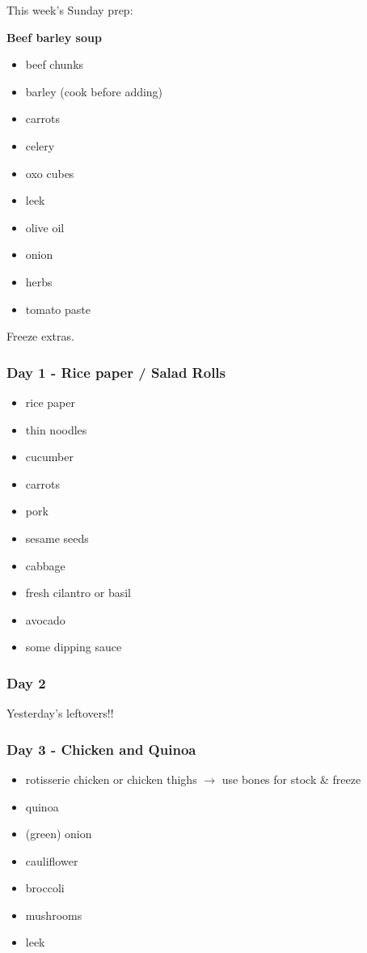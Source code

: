\documentclass[11pt, a4paper]{article}
\begin{document}
This week's Sunday prep:
\par
\vspace{1pc}
\noindent\textbf{Beef barley soup}
\par
\begin{itemize}
\item beef chunks
\item barley (cook before adding)
\item carrots
\item celery
\item oxo cubes
\item leek
\item olive oil
\item onion
\item herbs
\item tomato paste
\end{itemize}
Freeze extras.

\subsubsection{Day 1 - Rice paper / Salad Rolls}
\vspace{1pc}
\begin{itemize}
\item rice paper
\item thin noodles 
\item cucumber
\item carrots
\item pork
\item sesame seeds
\item cabbage
\item fresh cilantro or basil
\item avocado
\item some dipping sauce
\end{itemize}

\subsubsection{Day 2}
\vspace{1pc}
Yesterday's leftovers!!

\subsubsection{Day 3 - Chicken and Quinoa}
\vspace{1pc}
\begin{itemize}
\item rotisserie chicken or chicken thighs $\longrightarrow$ use bones for stock \& freeze
\item quinoa
\item (green) onion
\item cauliflower
\item broccoli
\item mushrooms
\item leek
\end{itemize}
\end{document}

